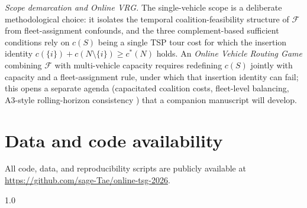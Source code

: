 \documentclass[11pt]{article}
\theoremstyle{plain}
\theoremstyle{definition}
\theoremstyle{remark}
\newcommand{\F}{\mathcal{F}}
\newcommand{\cstar}{c^{\ast}}
\begin{document}
\emph{Scope demarcation and Online VRG.} The single-vehicle scope is a deliberate methodological choice: it isolates the temporal coalition-feasibility structure of $\F$ from fleet-assignment confounds, and the three complement-based sufficient conditions rely on $c(S)$ being a single TSP tour cost for which the insertion identity $c(\{i\})+c(N\setminus\{i\})\ge\cstar(N)$ holds. An \emph{Online Vehicle Routing Game} combining $\F$ with multi-vehicle capacity \citep{gothe1996vrg,engevall2004heterogeneous} requires redefining $c(S)$ jointly with capacity and a fleet-assignment rule, under which that insertion identity can fail; this opens a separate agenda (capacitated coalition costs, fleet-level balancing, A3-style rolling-horizon consistency \citep{lehrer2013dynamic,kimms2016rolling}) that a companion manuscript will develop.

\section*{Data and code availability}
All code, data, and reproducibility scripts are publicly available at \url{https://github.com/sage-Tae/online-tsg-2026}.

\renewcommand{\bibfont}{\footnotesize}
\setlength{\bibsep}{1pt plus 0.2ex minus 0.2ex}
\begin{spacing}{1.0}


\end{spacing}
\end{document}
